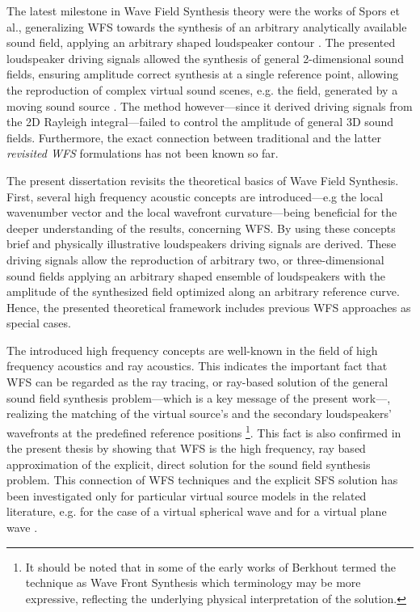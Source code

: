 The latest milestone in Wave Field Synthesis theory were the works of Spors et al., generalizing WFS towards the synthesis of an arbitrary analytically available sound field, applying an arbitrary shaped loudspeaker contour \cite{Spors2008:WFSrevisited, Rabenstein2007}.
The presented loudspeaker driving signals allowed the synthesis of general 2-dimensional sound fields, ensuring amplitude correct synthesis at a single reference point,
allowing the reproduction of complex virtual sound scenes, e.g. the field, generated by a moving sound source \cite{Ahrens2008moving, Ahrens2008moving_b, Ahrens2011_moving_source_WFS}.
The method however---since it derived driving signals from the 2D Rayleigh integral---failed to control the amplitude of general 3D sound fields.
Furthermore, the exact connection between traditional and the latter \emph{revisited WFS} formulations has not been known so far.

\vspace{3mm}
The present dissertation revisits the theoretical basics of Wave Field Synthesis.
First, several high frequency acoustic concepts are introduced---e.g the local wavenumber vector and the local wavefront curvature---being beneficial for the deeper understanding of the results, concerning WFS.
By using these concepts brief and physically illustrative loudspeakers driving signals are derived.
These driving signals allow the reproduction of arbitrary two, or three-dimensional sound fields applying an arbitrary shaped ensemble of loudspeakers with the amplitude of the synthesized field optimized along an arbitrary reference curve.
Hence, the presented theoretical framework includes previous WFS approaches as special cases.

The introduced high frequency concepts are well-known in the field of high frequency acoustics and ray acoustics.
This indicates the important fact that WFS can be regarded as the ray tracing, or ray-based solution of the general sound field synthesis problem---which is a key message of the present work---, realizing the matching of the virtual source's and the secondary loudspeakers' wavefronts at the predefined reference positions \footnote{It should be noted that in some of the early works of Berkhout termed the technique as Wave Front Synthesis \cite{berkhout1992wave, doi:10.1121/1.404755} which terminology may be more expressive, reflecting the underlying physical interpretation of the solution.}.
This fact is also confirmed in the present thesis by showing that WFS is the high frequency, ray based approximation of the explicit, direct solution for the sound field synthesis problem.
This connection of WFS techniques and the explicit SFS solution has been investigated only for particular virtual source models in the related literature, e.g. for the case of a virtual spherical wave \cite{Spors2010:analysis_and_improvement} and for a virtual plane wave \cite{Schultz2016:DAGA}.

